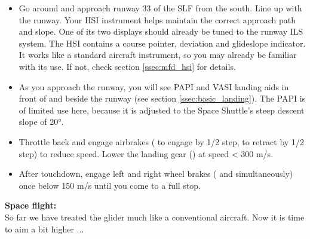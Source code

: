 \documentclass[Orbiter User Manual.tex]{subfiles}
\begin{document}
\begin{itemize}
\item Go around and approach runway 33 of the SLF from the south. Line up with the runway. Your HSI instrument helps maintain the correct approach path and slope. One of its two displays should already be tuned to the runway ILS system. The HSI contains a course pointer, deviation and glideslope indicator. It works like a standard aircraft instrument, so you may already be familiar with its use. If not, check section \ref{ssec:mfd_hsi} for details.
\item As you approach the runway, you will see PAPI and VASI landing aids in front of and beside the runway (see section \ref{ssec:basic_landing}). The PAPI is of limited use here, because it is adjusted to the Space Shuttle's steep descent slope of 20°.
\item Throttle back and engage airbrakes ( to engage by 1/2 step, \Ctrl{} to retract by 1/2 step) to reduce speed. Lower the landing gear () at speed < 300 m/s.
\item After touchdown, engage left and right wheel brakes (\keystroke{,} and  simultaneously) once below 150 m/s until you come to a full stop.
\end{itemize}

\noindent
\textbf{Space flight:}\\
So far we have treated the glider much like a conventional aircraft. Now it is time to aim a bit higher ...
\end{document}
